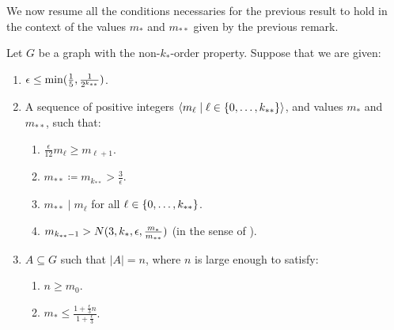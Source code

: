     We now resume all the conditions necessaries for the previous result to hold in the context of the values
    $m_*$ and $m_{**}$ given by the previous remark.

    \begin{lemma}[Corollary 5.15] \label{lem:resume_of_all_conditions_for_excellent_partitions}
        Let $G$ be a graph with the non-$k_{*}$-order property.
        Suppose that we are given:
        \begin{enumerate}
            \item $\epsilon \leq \min ( \frac{1}{5}, \frac{1}{2^{k_{**}}} )$.
            \item A sequence of positive integers $\left< m_\ell \mid \ell \in \{ 0, \dots, k_{**} \} \right>$, and values $m_*$
                and $m_{**}$, such that:
                \begin{enumerate}[label=(\alph*), ref=2.\alph*]
                    \item \label{itm:resume_of_all_conditions_for_excellent_partitions.a} $\frac{\epsilon}{12} m_\ell \geq m_{\ell + 1}$.
                    \item \label{itm:resume_of_all_conditions_for_excellent_partitions.b} $m_{**} \coloneqq m_{k_{**}} > \frac{3}{\epsilon}$.
                    \item \label{itm:resume_of_all_conditions_for_excellent_partitions.c} $m_{**} \mid m_\ell$ for all $\ell \in \{ 0, \dots, k_{**} \}$.
                    \item \label{itm:resume_of_all_conditions_for_excellent_partitions.d} $m_{k_{**}-1} > N( 3, k_*, \epsilon, \frac{m_*}{m_{**}} )$ (in the sense
                        of ).
            \end{enumerate}
            \item $A \subseteq G$ such that $|A| = n$, where $n$ is large enough to satisfy:
            \begin{enumerate}[label=(\alph*'), ref=3.\alph*]
                \item \label{itm:resume_of_all_conditions_for_excellent_partitions.a'} $n \geq m_0$. 
                \item \label{itm:resume_of_all_conditions_for_excellent_partitions.b'} $m_* \leq \frac{1 + \frac{\epsilon}{3}n}{1 + \frac{\epsilon}{3}}$.
            \end{enumerate}
        \end{enumerate}

\end{lemma}
